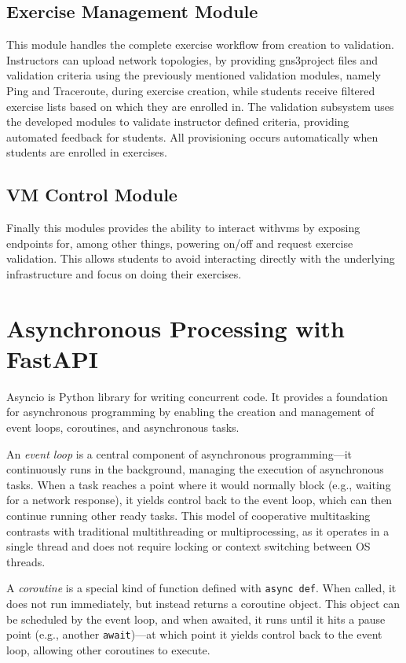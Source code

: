     \subsection{Exercise Management Module}
        This module handles the complete exercise workflow from creation to validation. Instructors can upload 
        network topologies, by providing gns3project files and validation criteria using the previously mentioned 
        validation modules, namely Ping and Traceroute, during exercise creation, while students receive filtered 
        exercise lists based on which they are enrolled in. The validation subsystem uses the developed modules 
        to validate instructor defined criteria, providing automated feedback for students. All provisioning 
        occurs automatically when students are enrolled in exercises.

    \subsection{VM Control Module}
        Finally this modules provides the ability to interact with\ac{vm}s by exposing endpoints for, among other 
        things, powering on/off and request exercise validation. This allows students to avoid interacting directly with 
        the underlying infrastructure and focus on doing their exercises.

\section{Asynchronous Processing with FastAPI}
    Asyncio is Python library for writing concurrent code. It provides a foundation for asynchronous programming by enabling 
    the creation and management of event loops, coroutines, and asynchronous tasks.

    An \textit{event loop} is a central component of asynchronous programming—it continuously runs in the background, managing 
    the execution of asynchronous tasks. When a task reaches a point where it would normally block (e.g., waiting for a network 
    response), it yields control back to the event loop, which can then continue running other ready tasks. This model of 
    cooperative multitasking contrasts with traditional multithreading or multiprocessing, as it operates in a single thread 
    and does not require locking or context switching between OS threads.

    A \textit{coroutine} is a special kind of function defined with \texttt{async def}. When called, it does not run immediately, 
    but instead returns a coroutine object. This object can be scheduled by the event loop, and when awaited, it runs until it 
    hits a pause point (e.g., another \texttt{await})—at which point it yields control back to the event loop, allowing other 
    coroutines to execute.

